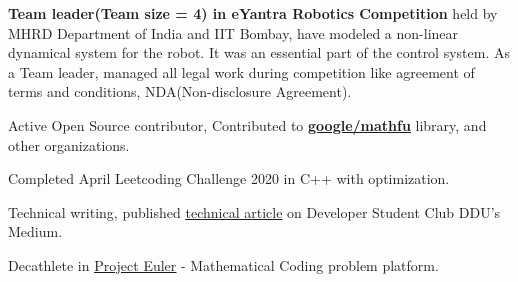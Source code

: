 \begin{cventries}
  \cventry
     {} %
     {} %
     {} %
     {} %
    {
    \begin{cvitems} %
         \item {\textbf{Team leader(Team size = 4) in eYantra Robotics Competition} held by MHRD Department of India and IIT Bombay, have modeled a non-linear dynamical system for the robot. It was an essential  part of the control system. As a Team leader, managed all legal work during competition like agreement of terms and conditions, NDA(Non-disclosure Agreement).}
         \vspace{1.5mm}
         \item { Active Open Source contributor, Contributed to \textbf{\underline{\href{https://github.com/google/mathfu/pull/44}{google/mathfu}}} library, and other organizations.}
         \vspace{1.5mm}
         \item{Completed April Leetcoding Challenge 2020 in C++ with optimization.}
         \vspace{1.5mm}
         \item{Technical writing, published  \underline{\href{https://medium.com/dscddu/world-of-gis-and-its-applications-65e64ecd2396}{technical article}} on Developer Student Club DDU's Medium.}
         \vspace{1.5mm}
         \item{Decathlete  in \underline{\href{https://projecteuler.net/}{Project Euler}} - Mathematical Coding problem platform.}
    \end{cvitems}
  }
\end{cventries}